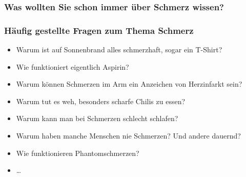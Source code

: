 \documentclass{beamer}
\begin{document}
{  
\begin{frame}
\frametitle{Was wollten Sie schon immer über Schmerz wissen?}

\end{frame} 
}



\begin{frame}
\frametitle{Häufig gestellte Fragen zum Thema Schmerz}


\begin{itemize}
\item
Warum ist auf Sonnenbrand alles schmerzhaft, sogar ein T-Shirt?
\item
Wie funktioniert eigentlich Aspirin? 
\item
Warum können Schmerzen im Arm ein Anzeichen von Herzinfarkt sein? 
\item
Warum tut es weh, besonders scharfe Chilis zu essen?
\item
Warum kann man bei Schmerzen schlecht schlafen? 
\item
Warum haben manche Menschen nie Schmerzen? Und andere dauernd?
\item
Wie funktionieren Phantomschmerzen?  
\item
\dots 
\end{itemize}


\end{frame}




\end{document}
